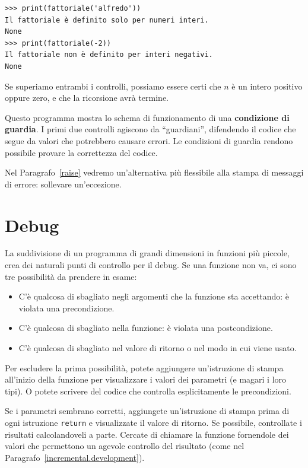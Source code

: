 \documentclass[10pt]{book}
\begin{document}
\begin{verbatim}
>>> print(fattoriale('alfredo'))
Il fattoriale è definito solo per numeri interi.
None
>>> print(fattoriale(-2))
Il fattoriale non è definito per interi negativi.
None
\end{verbatim}
% 
Se superiamo entrambi i controlli, possiamo essere
   certi che $n$ è un intero positivo oppure zero, e che la ricorsione avrà
   termine.

Questo programma mostra lo schema di funzionamento di una {\bf condizione di guardia}.
I primi due controlli agiscono da ``guardiani'', difendendo il codice che segue da valori che potrebbero causare errori. Le condizioni di guardia rendono possibile provare la correttezza del codice.

Nel Paragrafo~\ref{raise} vedremo un'alternativa più flessibile alla stampa di messaggi di errore: sollevare un'eccezione.


\section{Debug}
\label{factdebug}

La suddivisione di un programma di grandi dimensioni in funzioni più piccole, crea dei naturali punti di controllo per il debug. Se una funzione non va, ci sono tre possibilità da prendere in esame:

\begin{itemize}

\item C'è qualcosa di sbagliato negli argomenti che la funzione sta accettando: è violata una precondizione.

\item C'è qualcosa di sbagliato nella funzione: è violata una postcondizione.

\item C'è qualcosa di sbagliato nel valore di ritorno o nel modo in cui viene usato.

\end{itemize}

Per escludere la prima possibilità, potete aggiungere un'istruzione di stampa all'inizio della funzione per visualizzare i valori dei parametri (e magari i loro tipi). O potete scrivere del codice che controlla esplicitamente le precondizioni.

Se i parametri sembrano corretti, aggiungete un'istruzione di stampa prima di ogni istruzione {\tt return} e visualizzate il valore di ritorno. Se possibile, controllate i risultati calcolandoveli a parte. Cercate di chiamare la funzione fornendole dei valori che permettono un agevole controllo del risultato (come nel Paragrafo~\ref{incremental.development}).
\end{document}
